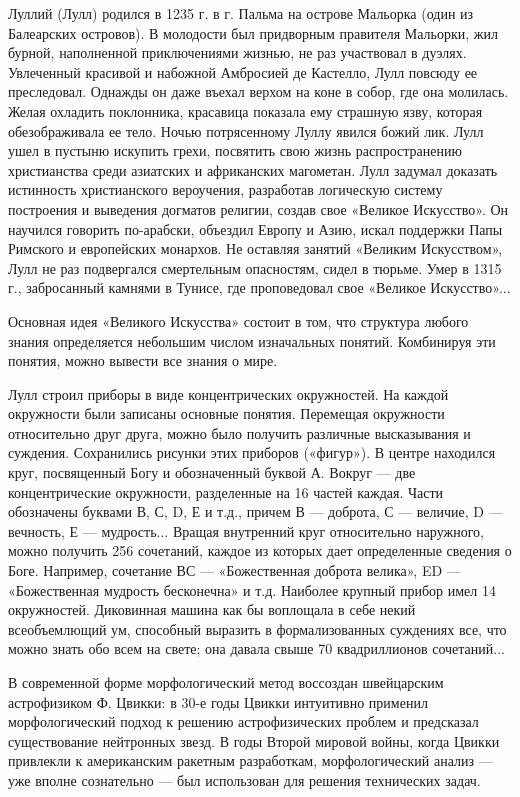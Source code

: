 Луллий  (Лулл) родился  в  1235 г.  в г.  Пальма  на острове  Мальорка
(один из  Балеарских островов).  В молодости был  придворным правителя
Мальорки,  жил  бурной,  наполненной   приключениями  жизнью,  не  раз
участвовал  в  дуэлях. Увлеченный  красивой  и  набожной Амбросией  де
Кастелло, Лулл повсюду  ее преследовал. Однажды он  даже въехал верхом
на  коне  в  собор,  где  она  молилась.  Желая  охладить  поклонника,
красавица показала ему страшную  язву, которая обезображивала ее тело.
Ночью  потрясенному  Луллу  явился  божий лик.  Лулл  ушел  в  пустыню
искупить  грехи,  посвятить  свою жизнь  распространению  христианства
среди  азиатских  и  африканских   магометан.  Лулл  задумал  доказать
истинность  христианского  вероучения, разработав  логическую  систему
построения  и   выведения  догматов  религии,  создав   свое  «Великое
Искусство». Он  научился говорить по-арабски, объездил  Европу и Азию,
искал  поддержки Папы  Римского  и европейских  монархов. Не  оставляя
занятий  «Великим Искусством»,  Лулл  не  раз подвергался  смертельным
опасностям,  сидел в  тюрьме. Умер  в 1315  г., забросанный  камнями в
Тунисе, где проповедовал свое «Великое Искусство»...

Основная идея «Великого Искусства» состоит в том, что структура любого
знания определяется  небольшим числом изначальных  понятий. Комбинируя
эти понятия, можно вывести все знания о мире.

Лулл  строил приборы  в  виде концентрических  окружностей. На  каждой
окружности  были  записаны   основные  понятия.  Перемещая  окружности
относительно друг друга, можно  было получить различные высказывания и
суждения.  Сохранились  рисунки  этих  приборов  («фигур»).  В  центре
находился круг, посвященный Богу и обозначенный буквой А. Вокруг — две
концентрические  окружности, разделенные  на 16  частей каждая.  Части
обозначены буквами В, С, D, Е и т.д., причем В — доброта, С — величие,
D  — вечность,  Е —  мудрость... Вращая  внутренний круг  относительно
наружного,  можно  получить  256  сочетаний, каждое  из  которых  дает
определенные сведения  о Боге. Например, сочетание  ВС — «Божественная
доброта  велика»,  ED  —  «Божественная мудрость  бесконечна»  и  т.д.
Наиболее  крупный прибор  имел 14  окружностей. Диковинная  машина как
бы  воплощала в  себе  некий всеобъемлющий  ум,  способный выразить  в
формализованных суждениях все, что можно  знать обо всем на свете; она
давала свыше 70 квадриллионов сочетаний...

В  современной  форме   морфологический  метод  воссоздан  швейцарским
астрофизиком  Ф.  Цвикки:  в  30-е  годы  Цвикки  интуитивно  применил
морфологический подход к решению  астрофизических проблем и предсказал
существование  нейтронных звезд.  В годы  Второй мировой  войны, когда
Цвикки привлекли к  американским ракетным разработкам, морфологический
анализ  —  уже  вполне  сознательно  —  был  использован  для  решения
технических задач.

